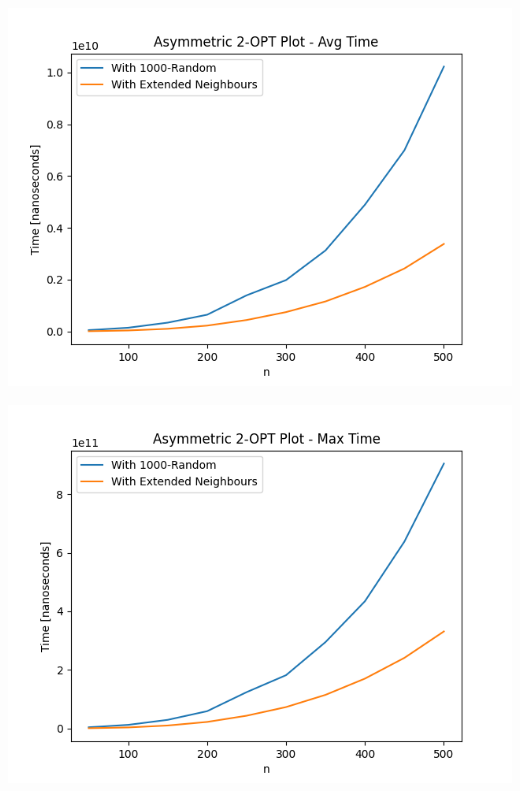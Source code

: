 \documentclass{article}
\begin{document}
\begin{center}
\includegraphics[width=\textwidth, 
                   height = 0.4\textheight, 
                   keepaspectratio]
                  {two_opt_asym_avg_time} 
\end{center}

\begin{center}
\includegraphics[width=\textwidth, 
                   height = 0.4\textheight, 
                   keepaspectratio]
                  {two_opt_asym_max_time} 
\end{center}
\end{document}
